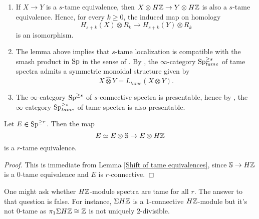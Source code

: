 \begin{remark}
\label{symmetric monoidal structure on tame spectra}
\begin{enumerate}

 	\item If $X\to Y$ is a $s$-tame equivalence, then $X\otimes H{\mathbb{Z}} \to Y\otimes H{\mathbb{Z}}$ is also a $s$-tame equivalence. Hence, for every $k\geq 0$, the induced map on homology
 	\[
 	H_{s+k}(X)\otimes R_{k}
 	\to
 	H_{s+k}(Y)\otimes R_{k}
 	\]
 	is an isomorphism.
	\item The lemma above implies that $s$-tame localization is compatible with the smash product in $\operatorname{Sp}$ in the sense of \cite[Definition 2.2.1.6.]{HA}. By \cite[Proposition 2.2.1.9.]{HA}, the $\infty$-category $\operatorname{Sp}^{\geq s}_{tame}$ of tame spectra admits a symmetric monoidal structure given by 
$$
X\hat{\otimes} Y = L_{tame}(X\otimes Y).
$$
	\item The $\infty$-category $\operatorname{Sp}^{\geq s}$ of $s$-connective spectra is presentable, hence by \cite[Proposition 5.5.4.15.]{HTT}, the $\infty$-category $\operatorname{Sp}^{\geq s}_{tame}$ of tame spectra is also presentable.
\end{enumerate}


\end{remark}

\begin{corollary}
\label{HZ commutes with tame localization}
	Let $E\in \operatorname{Sp}^{\geq r}$. Then the map
	$$
	E \simeq E\otimes {\mathbb{S}}  \to E\otimes H{\mathbb{Z}}
	$$ 
	is a $r$-tame equivalence.
\end{corollary}
	


\begin{proof}
	This is immediate from Lemma \ref{Shift of tame equivalences}, since ${\mathbb{S}} \to H{\mathbb{Z}}$ is a $0$-tame equivalence and $E$ is $r$-connective.
\end{proof}

\begin{comment}
I think this lemma is wrong...
\begin{lemma}
	The tame localization functor $L_{tame}:\Sp^{\geq r} \to \Sp^{\geq r}$ is symmetric monoidal.
\end{lemma}
\end{comment}

One might ask whether $H{\mathbb{Z}}$-module spectra are tame for all $r$. The answer to that question is false. For instance, $\Sigma H{\mathbb{Z}}$ is a $1$-connective $H{\mathbb{Z}}$-module but it's not $0$-tame as $\pi_{1}\Sigma H{\mathbb{Z}}\cong {\mathbb{Z}}$ is not uniquely $2$-divisible.


